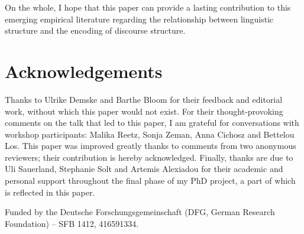 \documentclass[output=paper,colorlinks,citecolor=brown]{langscibook}
\begin{document}
On the whole, I hope that this paper can provide a lasting contribution to this emerging empirical literature regarding the relationship between linguistic structure and the encoding of discourse structure.

\section*{Acknowledgements}
Thanks to Ulrike Demske and Barthe Bloom for their feedback and editorial work, without which this paper would not exist. For their thought-provoking comments on the talk that led to this paper, I am grateful for conversations with workshop participants:  Malika Reetz, Sonja Zeman, Anna Cichosz and Bettelou Los. This paper was improved greatly thanks to comments from two anonymous reviewers; their contribution is hereby acknowledged. Finally, thanks are due to Uli Sauerland, Stephanie Solt and Artemis Alexiadou for their academic and personal support throughout the final phase of my PhD project, a part of which is reflected in this paper.

Funded by the Deutsche Forschungsgemeinschaft (DFG, German Research Foundation) -- SFB 1412, 416591334.
\end{document}
